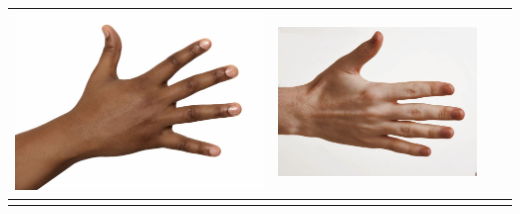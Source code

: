 \begin{longtable}{|N||c|c|c|}
\begin{minipage}{.29\textwidth}
    \includegraphics[width=\textwidth,height=\textheight,keepaspectratio]{../inputs/hand_dark.jpg}
  \end{minipage} & 
  \begin{minipage}{.29\textwidth}
    \includegraphics[width=\textwidth,height=\textheight,keepaspectratio]{../rc_test/outputs/20170516_proportional_test/hand_pale_to_hand_dark.jpg}
  \end{minipage} \\
\hline  \label{row:prop_test_hand_pale_to_hand_brown} &
  \begin{minipage}{.29\textwidth}

\end{minipage}
\end{longtable}
